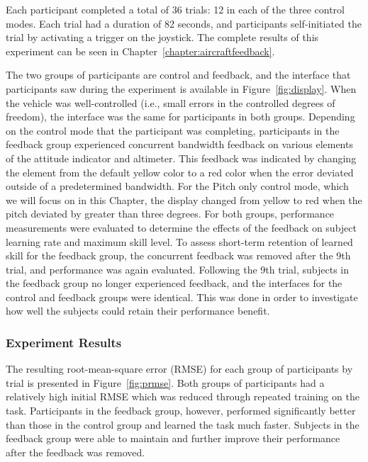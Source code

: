 Each participant completed a total of 36 trials: 12 in each of the three control modes.
Each trial had a duration of 82 seconds, and participants self-initiated the trial by activating a trigger on the joystick.
The complete results of this experiment can be seen in Chapter~\ref{chapter:aircraftfeedback}.

The two groups of participants are control and feedback, and the interface that participants saw during the experiment is available in Figure~\ref{fig:display}.
When the vehicle was well-controlled (i.e., small errors in the controlled degrees of freedom), the interface was the same for participants in both groups.
Depending on the control mode that the participant was completing, participants in the feedback group experienced concurrent bandwidth feedback on various elements of the attitude indicator and altimeter.
This feedback was indicated by changing the element from the default yellow color to a red color when the error deviated outside of a predetermined bandwidth.
For the Pitch only control mode, which we will focus on in this Chapter, the display changed from yellow to red when the pitch deviated by greater than three degrees.
For both groups, performance measurements were evaluated to determine the effects of the feedback on subject learning rate and maximum skill level.
To assess short-term retention of learned skill for the feedback group, the concurrent feedback was removed after the 9th trial, and performance was again evaluated.
Following the 9th trial, subjects in the feedback group no longer experienced feedback, and the interfaces for the control and feedback groups were identical.
This was done in order to investigate how well the subjects could retain their performance benefit.

\subsubsection{Experiment Results}
The resulting root-mean-square error (RMSE) for each group of participants by trial is presented in Figure~\ref{fig:prmse}.
Both groups of participants had a relatively high initial RMSE which was reduced through repeated training on the task.
Participants in the feedback group, however, performed significantly better than those in the control group and learned the task much faster.
Subjects in the feedback group were able to maintain and further improve their performance after the feedback was removed.

